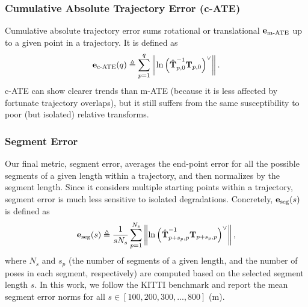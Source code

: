 \subsubsection{Cumulative Absolute Trajectory Error (c-ATE)}
Cumulative absolute trajectory error sums rotational or translational $\boldsymbol{\mathbf{e}}_\text{m-ATE}$ up to a given point in a trajectory. It is defined as
\begin{equation}
	\boldsymbol{\mathbf{e}}_\text{c-ATE} (q)  \triangleq \sum_{p=1}^{q} \left\Vert\text{ln}\left({\hat{\boldsymbol{\mathbf{T}}}^{-1}_{p,0} \boldsymbol{\mathbf{T}}_{p,0}} \right)^{\vee}\right\Vert.
\end{equation}
c-ATE can show clearer trends than m-ATE (because it is less affected by fortunate trajectory overlaps), but it still suffers from the same susceptibility to poor (but isolated) relative transforms.

 
\subsubsection{Segment Error} Our final metric, segment error, averages the end-point error for all the possible segments of a given length within a trajectory, and then normalizes by the segment length. Since it considers multiple starting points within a trajectory, segment error is much less sensitive to isolated degradations. Concretely, $\boldsymbol{\mathbf{e}}_\text{seg}(s)$ is defined as
\begin{equation}
	\boldsymbol{\mathbf{e}}_\text{seg}(s)  \triangleq \frac{1}{s N_s} \sum_{p=1}^{N_s} \left\Vert\text{ln}\left({\hat{\boldsymbol{\mathbf{T}}}^{-1}_{p+s_p,p} \boldsymbol{\mathbf{T}}_{p+s_p,p}} \right)^{\vee}\right\Vert,
\end{equation}
where $N_s$ and $s_p$ (the number of segments of a given length, and the number of poses in each segment, respectively) are computed based on the selected segment length $s$. In this work, we follow the KITTI benchmark and report the mean segment error norms for all $s \in {[100, 200, 300, ..., 800]}$ (m). 

